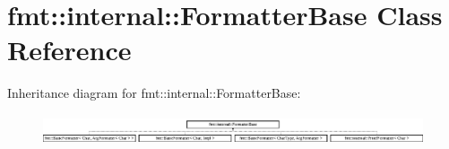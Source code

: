 \hypertarget{classfmt_1_1internal_1_1FormatterBase}{}\section{fmt\+:\+:internal\+:\+:Formatter\+Base Class Reference}
\label{classfmt_1_1internal_1_1FormatterBase}
Inheritance diagram for fmt\+:\+:internal\+:\+:Formatter\+Base\+:\begin{figure}[H]
\begin{center}
\leavevmode
\includegraphics[height=0.888889cm]{classfmt_1_1internal_1_1FormatterBase}
\end{center}
\end{figure}
